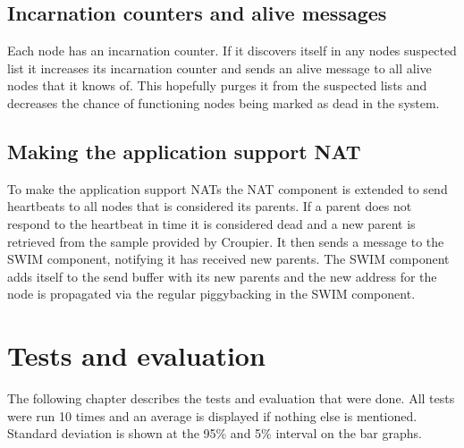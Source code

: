 \documentclass[10pt]{proc}
\begin{document}
\subsection{Incarnation counters and alive messages}
Each node has an incarnation counter. If it discovers itself in any nodes suspected list it increases its incarnation counter and sends an alive message to all alive nodes that it knows of. This hopefully purges it from the suspected lists and decreases the chance of functioning nodes being marked as dead in the system.
\subsection{Making the application support NAT}
To make the application support NATs the NAT component is extended to send heartbeats to all nodes that is considered its parents. If a parent does not respond to the heartbeat in time it is considered dead and a new parent is retrieved from the sample provided by Croupier. It then sends a message to the SWIM component, notifying it has received new parents. The SWIM component adds itself to the send buffer with its new parents and the new address for the node is propagated via the regular piggybacking in the SWIM component.
\section{Tests and evaluation}
The following chapter describes the tests and evaluation that were done. All tests were run 10 times and an average is displayed if nothing else is mentioned. Standard deviation is shown at the 95\% and 5\% interval on the bar graphs.
\end{document}
